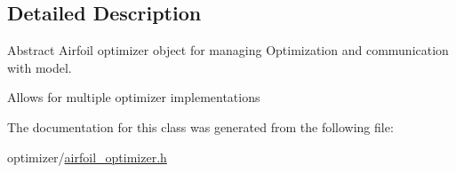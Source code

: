\subsection{Detailed Description}
Abstract Airfoil optimizer object for managing Optimization and communication with model. 

Allows for multiple optimizer implementations 

The documentation for this class was generated from the following file\+:\begin{DoxyCompactItemize}
\item 
optimizer/\hyperlink{airfoil__optimizer_8h}{airfoil\+\_\+optimizer.\+h}\end{DoxyCompactItemize}
